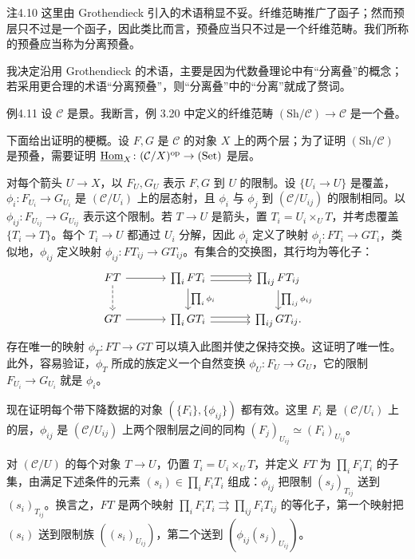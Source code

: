 \begin{origstatement}{注}{4.10}\label{ch04:rem410}
这里由 Grothendieck 引入的术语稍显不妥。纤维范畴推广了函子；然而预层只不过是一个函子，因此类比而言，预叠应当只不过是一个纤维范畴。我们所称的预叠应当称为分离预叠。

我决定沿用 Grothendieck 的术语，主要是因为代数叠理论中有“分离叠”的概念；若采用更合理的术语“分离预叠”，则“分离叠”中的“分离”就成了赘词。
\end{origstatement}

\begin{origstatement}{例}{4.11}\label{ch04:ex411}
设 $\mathcal C$ 是景。我断言，例 3.20 中定义的纤维范畴 $(\mathrm{Sh}/\mathcal C)\to\mathcal C$ 是一个叠。

下面给出证明的梗概。设 $F,G$ 是 $\mathcal C$ 的对象 $X$ 上的两个层；为了证明 $(\mathrm{Sh}/\mathcal C)$ 是预叠，需要证明 $\underline{\operatorname{Hom}}_X\colon(\mathcal C/X)^{\mathrm{op}}\to(\mathrm{Set})$ 是层。

对每个箭头 $U\to X$，以 $F_U,G_U$ 表示 $F,G$ 到 $U$ 的限制。设 $\{U_i\to U\}$ 是覆盖，$\phi_i\colon F_{U_i}\to G_{U_i}$ 是 $(\mathcal C/U_i)$ 上的层态射，且 $\phi_i$ 与 $\phi_j$ 到 $(\mathcal C/U_{ij})$ 的限制相同。以 $\phi_{ij}\colon F_{U_{ij}}\to G_{U_{ij}}$ 表示这个限制。若 $T\to U$ 是箭头，置 $T_i=U_i\times_U T$，并考虑覆盖 $\{T_i\to T\}$。每个 $T_i\to U$ 都通过 $U_i$ 分解，因此 $\phi_i$ 定义了映射 $\phi_i\colon FT_i\to GT_i$，类似地，$\phi_{ij}$ 定义映射 $\phi_{ij}\colon FT_{ij}\to GT_{ij}$。有集合的交换图，其行均为等化子：
\[
\begin{tikzcd}[column sep=large]
 FT\arrow[r]\arrow[d,dashed]&\prod_i FT_i\arrow[r,shift left=.5ex]\arrow[r,shift right=.5ex]\arrow[d,"{\prod_i\phi_i}"]&\prod_{ij}FT_{ij}\arrow[d,"{\prod_{ij}\phi_{ij}}"]\\
 GT\arrow[r]&\prod_i GT_i\arrow[r,shift left=.5ex]\arrow[r,shift right=.5ex]&\prod_{ij}GT_{ij}.
\end{tikzcd}
\]
存在唯一的映射 $\phi_T\colon FT\to GT$ 可以填入此图并使之保持交换。这证明了唯一性。此外，容易验证，$\phi_T$ 所成的族定义一个自然变换 $\phi_U\colon F_U\to G_U$，它的限制 $F_{U_i}\to G_{U_i}$ 就是 $\phi_i$。

现在证明每个带下降数据的对象 $(\{F_i\},\{\phi_{ij}\})$ 都有效。这里 $F_i$ 是 $(\mathcal C/U_i)$ 上的层，$\phi_{ij}$ 是 $(\mathcal C/U_{ij})$ 上两个限制层之间的同构 $(F_j)_{U_{ij}}\simeq(F_i)_{U_{ij}}$。

对 $(\mathcal C/U)$ 的每个对象 $T\to U$，仍置 $T_i=U_i\times_U T$，并定义 $FT$ 为 $\prod_i F_iT_i$ 的子集，由满足下述条件的元素 $(s_i)\in\prod_i F_iT_i$ 组成：$\phi_{ij}$ 把限制 $(s_j)_{T_{ij}}$ 送到 $(s_i)_{T_{ij}}$。换言之，$FT$ 是两个映射 $\prod_i F_iT_i\rightrightarrows\prod_{ij}F_iT_{ij}$ 的等化子，第一个映射把 $(s_i)$ 送到限制族 $((s_i)_{U_{ij}})$，第二个送到 $(\phi_{ij}(s_j)_{U_{ij}})$。


\end{origstatement}
